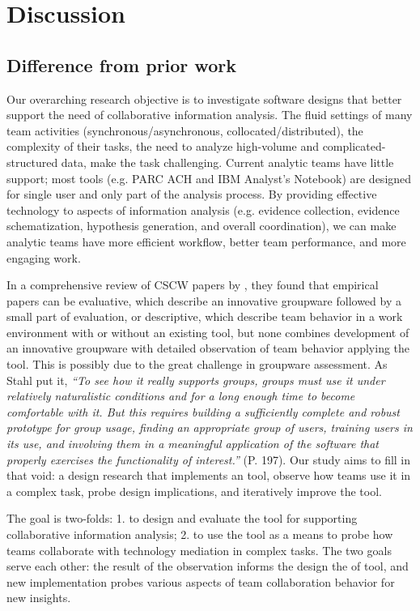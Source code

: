 \section{Discussion}

\subsection{Difference from prior work}

Our overarching research objective is to investigate software designs that better support the need of collaborative information analysis. The fluid settings of many team activities (synchronous/asynchronous, collocated/distributed), the complexity of their tasks, the need to analyze high-volume and complicated-structured data, make the task challenging. Current analytic teams have little support; most tools (e.g. PARC ACH and IBM Analyst's Notebook) are designed for single user and only part of the analysis process. By providing effective technology to aspects of information analysis (e.g. evidence collection, evidence schematization, hypothesis generation, and overall coordination), we can make analytic teams have more efficient workflow, better team performance, and more engaging work. 

In a comprehensive review of CSCW papers by \cite{Wainer2007}, they found that empirical papers can be evaluative, which describe an innovative groupware followed by a small part of evaluation, or descriptive, which describe team behavior in a work environment with or without an existing tool, but none combines development of an innovative groupware with detailed observation of team behavior applying the tool. This is possibly due to the great challenge in groupware assessment. As Stahl \cite{Stahl2006} put it, \textit{``To see how it really supports groups, groups must use it under relatively naturalistic conditions and for a long enough time to become comfortable with it. But this requires building a sufficiently complete and robust prototype for group usage, finding an appropriate group of users, training users in its use, and involving them in a meaningful application of the software that properly exercises the functionality of interest.''} (P. 197). Our study aims to fill in that void: a design research that implements an tool, observe how teams use it in a complex task, probe design implications, and iteratively improve the tool.

The goal is two-folds: 1. to design and evaluate the tool for supporting collaborative information analysis; 2. to use the tool as a means to probe how teams collaborate with technology mediation in complex tasks. The two goals serve each other: the result of the observation informs the design the of tool, and new implementation probes various aspects of team collaboration behavior for new insights.

